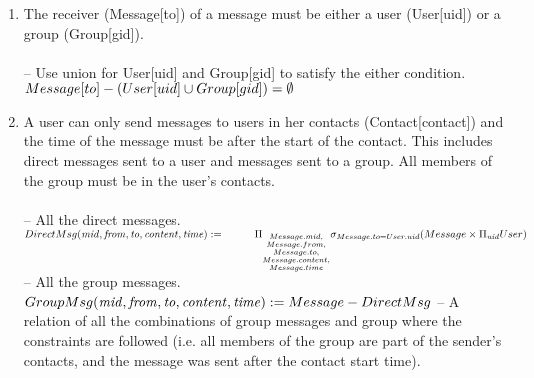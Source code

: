 \documentclass{article}
\newcommand{\var}[1]{\mathit{#1}}
\begin{document}
\begin{enumerate}

\item   %
The receiver (Message[to]) of a message must be either a user (User[uid]) or a group (Group[gid]). \\\\ [5pt]
\large{
\hspace*{1cm} -- Use union for User[uid] and Group[gid] to satisfy the either condition.\\ [5pt]
$
Message[to] - (User[uid] \cup Group[gid]) =  \emptyset \\[5pt]
$
}
\item %
A user can only send messages to users in her contacts (Contact[contact]) and the time of the message must be after the start of the contact. This includes direct messages sent to a user and messages sent to a group. All members of the group must be in the user's contacts. \\\\ [5pt]
\large{
\hspace*{1cm} -- All the direct messages. \\ [5pt]
$
DirectMsg(\var{mid}, \var{from}, \var{to}, \var{content}, \var{time}) := \\ [5pt]
\hspace*{1cm} \Pi_{\substack{Message.mid, \\
							Message.from, \\
							Message.to, \\
							Message.content, \\
							Message.time}}
			\sigma_{Message.to = User.uid}
			(Message \times \Pi_{\var{uid}} User) \\\\\\ [5pt]
$
\hspace*{1cm} -- All the group messages. \\ [5pt]
$
GroupMsg(\var{mid}, \var{from}, \var{to}, \var{content}, \var{time}) := Message - DirectMsg \\\\ [5pt]
$
\hspace*{1cm} -- A relation of all the combinations of group messages and group where the \\ \hspace*{1cm} constraints are followed (i.e. all members of the group are part of the sender's \hspace*{1cm} contacts, and the message was sent after the contact start time). \\ [5pt]
}
\end{enumerate}
\end{document}
